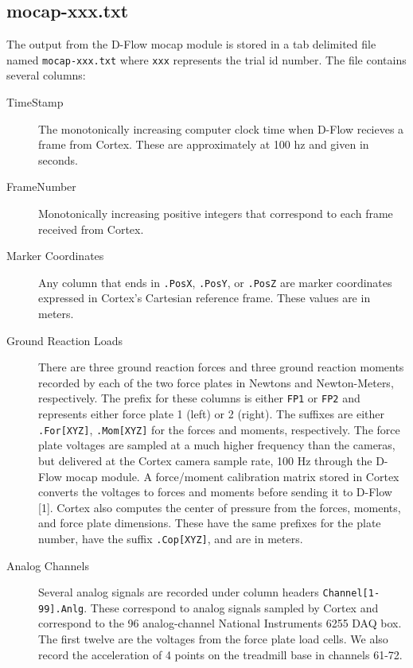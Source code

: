 \documentclass{article}
\begin{document}
\subsection{mocap-xxx.txt}

The output from the D-Flow mocap module is stored in a tab delimited file named
\verb+mocap-xxx.txt+ where \verb+xxx+ represents the trial id number. The file
contains several columns:

\begin{description}
  \item[TimeStamp] The monotonically increasing computer clock time when D-Flow
    recieves a frame from Cortex. These are approximately at 100 hz and given
    in seconds.
  \item[FrameNumber] Monotonically increasing positive integers that correspond
    to each frame received from Cortex.
  \item[Marker Coordinates] Any column that ends in \verb+.PosX+, \verb+.PosY+,
    or \verb+.PosZ+ are marker coordinates expressed in Cortex's Cartesian
    reference frame. These values are in meters.
  \item[Ground Reaction Loads] There are three ground reaction forces and three
    ground reaction moments recorded by each of the two force plates in Newtons
    and Newton-Meters, respectively. The prefix for these columns is either
    \verb+FP1+ or \verb+FP2+ and represents either force plate 1 (left) or 2
    (right). The suffixes are either \verb+.For[XYZ]+, \verb+.Mom[XYZ]+ for the
    forces and moments, respectively. The force plate voltages are sampled at a
    much higher frequency than the cameras, but delivered at the Cortex camera
    sample rate, 100 Hz through the D-Flow mocap module. A force/moment
    calibration matrix stored in Cortex converts the voltages to forces and
    moments before sending it to D-Flow [1]. Cortex also computes the center of
    pressure from the forces, moments, and force plate dimensions. These have
    the same prefixes for the plate number, have the suffix \verb+.Cop[XYZ]+,
    and are in meters.
  \item[Analog Channels] Several analog signals are recorded under column
    headers \verb+Channel[1-99].Anlg+. These correspond to analog signals
    sampled by Cortex and correspond to the 96 analog-channel National 
    Instruments 6255 DAQ box. The first twelve are the voltages from the 
    force plate load cells. We also record the acceleration of 4 points on the
    treadmill base in channels 61-72.
\end{description}
\end{document}
